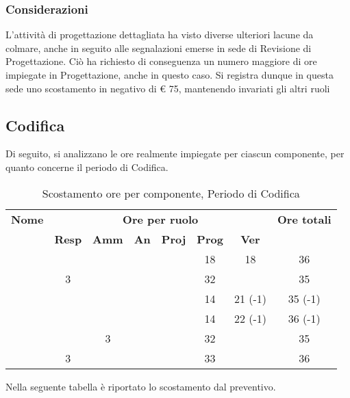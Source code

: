 \subsubsection{Considerazioni}
L'attività di progettazione dettagliata ha visto diverse ulteriori lacune da colmare, anche in seguito alle segnalazioni emerse in sede di Revisione di Progettazione. Ciò ha richiesto di conseguenza un numero maggiore di ore impiegate in Progettazione, anche in questo caso. Si registra dunque in questa sede uno scostamento in negativo di € 75, mantenendo invariati gli altri ruoli

\subsection{Codifica}

Di seguito, si analizzano le ore realmente impiegate per ciascun componente, per quanto concerne il periodo di Codifica.

\begin{table}[H]
	\begin{center}
		\begin{tabular}{|c|c|c|c|c|c|c|c|}
			\hline
			\textbf{Nome} & \multicolumn{6}{c|}{\textbf{Ore per ruolo}} & \textbf{Ore totali} \\\cline{2-7}
			& \textbf{Resp} & \textbf{Amm} & \textbf{An} & \textbf{Proj} & \textbf{Prog} & \textbf{Ver} & \\
			\hline
			\MC			&		&		&		&		&	18	&	18	&	36	\\
			\hline
			\AN			&	3	&		&		&	 	&	32	&		& 	35	\\
			\hline
			\DAN		&		&		&		&		&	14	&	21 (-1)	&	35 (-1)	\\
			\hline
			\AS			&		&	 	&	 	&		&	14 	& 	22 (-1)	&	36	(-1)\\
			\hline
			\NS 		&		&	3	&		&		&	32	& 		&	35	\\
			\hline
			\DS			& 	3	&		&		&		&	33	&		&	36	\\
			\hline
		\end{tabular}
	\end{center}
	\caption{Scostamento ore per componente, Periodo di Codifica}
\end{table}

Nella seguente tabella è riportato lo scostamento dal preventivo.

